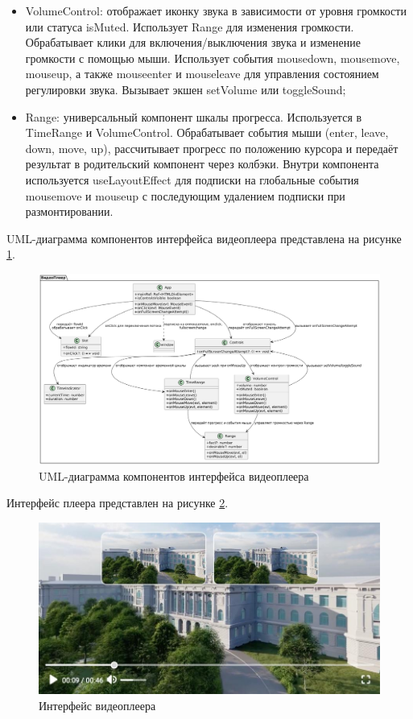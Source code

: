 \begin{itemize}[label=$\bullet$]
		\item VolumeControl: отображает иконку звука в зависимости от уровня громкости или статуса isMuted. Использует Range для изменения громкости. Обрабатывает клики для включения/выключения звука и изменение громкости с помощью мыши. Использует события mousedown, mousemove, mouseup, а также mouseenter и mouseleave для управления состоянием регулировки звука. Вызывает экшен setVolume или toggleSound;
		\item Range: универсальный компонент шкалы прогресса. Используется в TimeRange и VolumeControl. Обрабатывает события мыши (enter, leave, down, move, up), рассчитывает прогресс по положению курсора и передаёт результат в родительский компонент через колбэки. Внутри компонента используется useLayoutEffect для подписки на глобальные события mousemove и mouseup с последующим удалением подписки при размонтировании.
	\end{itemize}

	UML-диаграмма компонентов интерфейса видеоплеера представлена на рисунке \ref{fig:uml_player}.

	\begin{figure}[ht!] 
		\center
		\includegraphics [scale=0.33] {my_folder/images//uml_player}
		\caption{UML-диаграмма компонентов интерфейса видеоплеера} 
		\label{fig:uml_player}  
	\end{figure}

	Интерфейс плеера представлен на рисунке \ref{fig:player_interface}.

	\begin{figure}[ht!] 
		\center
		\includegraphics [scale=0.37] {my_folder/images//player_interface}
		\caption{Интерфейс видеоплеера} 
		\label{fig:player_interface}  
	\end{figure}

